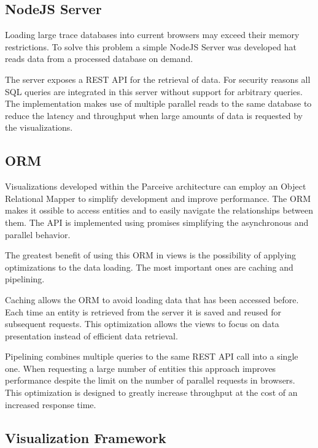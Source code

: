 \subsection{NodeJS Server}

Loading large trace databases into current browsers may exceed their memory restrictions. To solve this problem a simple NodeJS Server was developed hat reads data from a processed database on demand.

The server exposes a REST \cite{rest} API for the retrieval of data. For security reasons all SQL queries are integrated in this server without support for arbitrary queries. The implementation makes use of multiple parallel reads to the same database to reduce the latency and throughput when large amounts of data is requested by the visualizations.

\subsection{ORM}

Visualizations developed within the Parceive architecture can employ an Object Relational Mapper to simplify development and improve performance. The ORM makes it ossible to access entities and to easily navigate the relationships between them. The API is implemented using promises \cite{promises} simplifying the asynchronous and parallel behavior.

The greatest benefit of using this ORM in views is the possibility of applying optimizations to the data loading. The most important ones are caching and pipelining.

Caching allows the ORM to avoid loading data that has been accessed before. Each time an entity is retrieved from the server it is saved and reused for subsequent requests. This optimization allows the views to focus on data presentation instead of efficient data retrieval.

Pipelining combines multiple queries to the same REST API call into a single one. When requesting a large number of entities this approach improves performance despite the limit on the number of parallel requests in browsers. This optimization is designed to greatly increase throughput at the cost of an increased response time.

\subsection{Visualization Framework}

